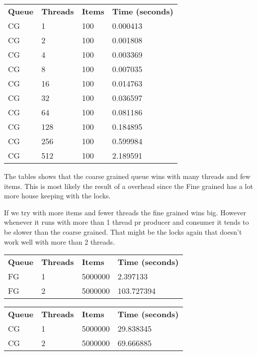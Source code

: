 \documentclass[12pt]{article}
\begin{document}
\begin{table}[h]
\begin{tabular}{llll}
\textbf{Queue}  &   \textbf{Threads}  & \textbf{Items}   &  \textbf{Time (seconds)} \\
CG  &    1     &  100   &   0.000413 \\
CG  &    2     &  100   &   0.001808 \\
CG  &    4     &  100   &   0.003369 \\
CG  &    8     &  100   &   0.007035 \\
CG  &    16    &  100   &   0.014763 \\
CG  &    32    &  100   &   0.036597 \\
CG  &    64    &  100   &   0.081186 \\
CG  &    128   &  100   &   0.184895 \\
CG  &    256   &  100   &   0.599984 \\
CG  &    512   &  100   &   2.189591 \\
\end{tabular}
\end{table}

The tables shows that the coarse grained queue wins with many threads and few items. This is most likely the result of a overhead since the Fine grained has a lot more house keeping with the locks.

If we try with more items and fewer threads the fine grained wins big. However whenever it runs with more than 1 thread pr producer and consumer it tends to be slower than the coarse grained. That might be the locks again that doesn't work well with more than 2 threads.

\begin{table}[h]
\begin{tabular}{llll}
\textbf{Queue}  &   \textbf{Threads}  & \textbf{Items}   &  \textbf{Time (seconds)} \\
FG    &    1       &  5000000 &  2.397133 \\
FG  &      2       &  5000000 &  103.727394\\
\end{tabular}
\end{table}

\begin{table}[h]
\begin{tabular}{llll}
\textbf{Queue}  &   \textbf{Threads}  & \textbf{Items}   &  \textbf{Time (seconds)} \\
CG   &     1  &       5000000 &  29.838345 \\
CG  &      2       &  5000000  & 69.666885 \\
\end{tabular}
\end{table}
\end{document}
